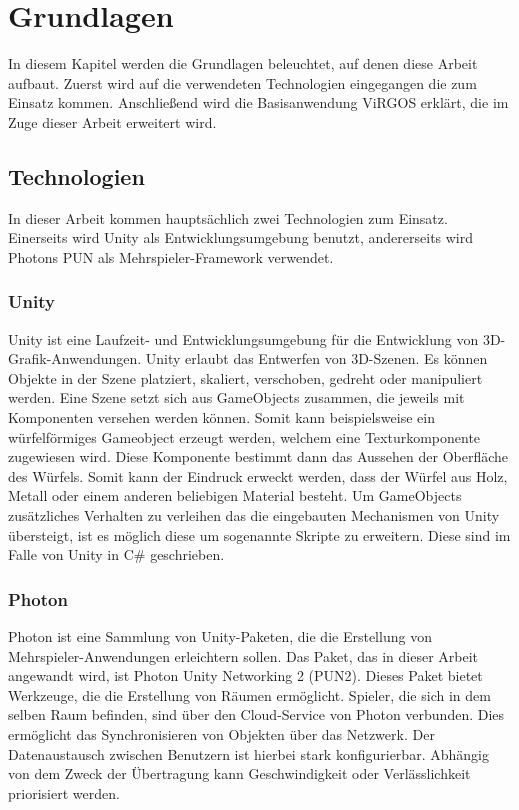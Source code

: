 \section{Grundlagen}
In diesem Kapitel werden die Grundlagen beleuchtet, auf denen diese Arbeit aufbaut. Zuerst wird auf die verwendeten Technologien eingegangen die zum Einsatz kommen. Anschließend wird die Basisanwendung ViRGOS erklärt, die im Zuge dieser Arbeit erweitert wird. 

\subsection{Technologien}

In dieser Arbeit kommen hauptsächlich zwei Technologien zum Einsatz. Einerseits wird Unity als Entwicklungsumgebung benutzt, andererseits wird Photons PUN als Mehrspieler-Framework verwendet. 

\subsubsection*{Unity}
Unity ist eine Laufzeit- und Entwicklungsumgebung für die Entwicklung von 3D-Grafik-Anwendungen. Unity erlaubt das Entwerfen von 3D-Szenen. Es können Objekte in der Szene platziert, skaliert, verschoben, gedreht oder manipuliert werden. Eine Szene setzt sich aus GameObjects zusammen, die jeweils mit Komponenten versehen werden können. Somit kann beispielsweise ein würfelförmiges Gameobject erzeugt werden, welchem eine Texturkomponente zugewiesen wird. Diese Komponente bestimmt dann das Aussehen der Oberfläche des Würfels. Somit kann der Eindruck erweckt werden, dass der Würfel aus Holz, Metall oder einem anderen beliebigen Material besteht. Um GameObjects zusätzliches Verhalten zu verleihen das die eingebauten Mechanismen von Unity übersteigt, ist es möglich diese um sogenannte Skripte zu erweitern. Diese sind im Falle von Unity in C\# geschrieben.
\newpage

\subsubsection*{Photon}
Photon ist eine Sammlung von Unity-Paketen, die die Erstellung von Mehrspieler-Anwendungen erleichtern sollen. Das Paket, das in dieser Arbeit angewandt wird, ist \glqq Photon Unity Networking 2\grqq{} (PUN2). Dieses Paket bietet Werkzeuge, die die Erstellung von Räumen ermöglicht. Spieler, die sich in dem selben Raum befinden, sind über den Cloud-Service von Photon verbunden. Dies ermöglicht das Synchronisieren von Objekten über das Netzwerk. Der Datenaustausch zwischen Benutzern ist hierbei stark konfigurierbar. Abhängig von dem Zweck der Übertragung kann Geschwindigkeit oder Verlässlichkeit priorisiert werden.

